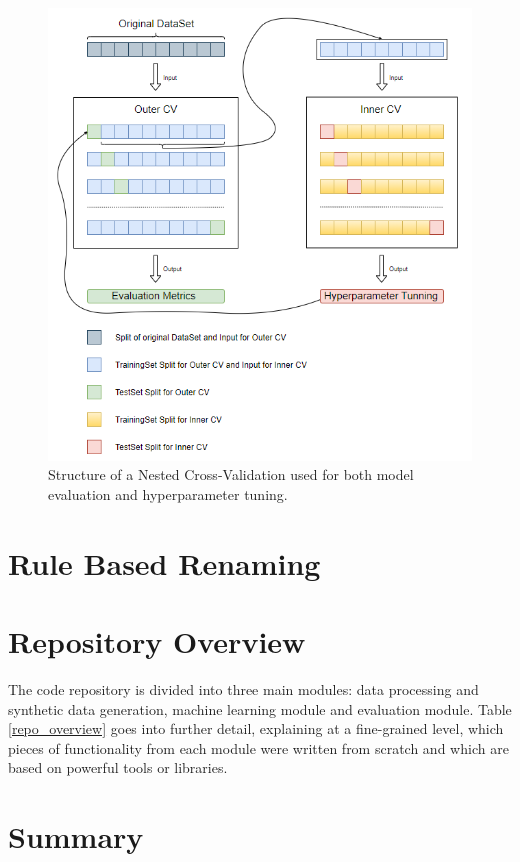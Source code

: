 \begin{figure}[H]
  \centering
  \includegraphics[scale=0.95]{Images/nested_cv.png}
  \caption{Structure of a Nested Cross-Validation used for both model evaluation and hyperparameter tuning.}
  \label{NestedCV}
\end{figure}

\section{Rule Based Renaming}

\section{Repository Overview}

The code repository is divided into three main modules: data processing and synthetic data generation, machine learning module and evaluation module. Table \ref{repo_overview} goes into further detail, explaining at a fine-grained level, which pieces of functionality from each module were written from scratch and which are based on powerful tools or libraries.  

\section{Summary}


